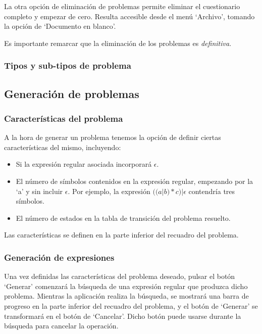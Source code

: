 La otra opción de eliminación de problemas permite eliminar el cuestionario completo y empezar de cero.
Resulta accesible desde el menú `Archivo', tomando la opción de `Documento en blanco'.


Es importante remarcar que la eliminación de los problemas es \emph{definitiva}.

\subsubsection{Tipos y sub-tipos de problema}

\subsection{Generación de problemas}

\subsubsection{Características del problema}
A la hora de generar un problema tenemos la opción de definir ciertas características del mismo, incluyendo:
\begin{itemize}
	\item Si la expresión regular asociada incorporará $ \epsilon $.
	\item El número de símbolos contenidos en la expresión regular, empezando por la `a' y sin incluir $ \epsilon $.
	Por ejemplo, la expresión $ ((a|b)*c)|\epsilon $ contendría tres símbolos.
	\item El número de estados en la tabla de transición del problema resuelto.
\end{itemize}
Las características se definen en la parte inferior del recuadro del problema.


\subsubsection{Generación de expresiones}
Una vez definidas las características del problema deseado, pulsar el botón `Generar' comenzará la búsqueda de una expresión regular que produzca dicho problema.
Mientras la aplicación realiza la búsqueda, se mostrará una barra de progreso en la parte inferior del recuadro del problema, y el botón de `Generar' se transformará en el botón de `Cancelar'.
Dicho botón puede usarse durante la búsqueda para cancelar la operación.

